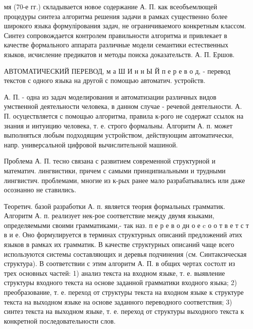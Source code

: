 \documentclass[10pt]{article}
\begin{document}
мя (70-е гг.) складывается новое содержание А. П. как всеобъемлющей процедуры синтеза алгоритма решения задачи в рамках существенно более широкого языка формулірования задач, не ограничиваемого конкретным классом. Синтез сопровождается контролем правильности алгоритма и привлекает в качестве формального аппарата различные модели семантики естественных языков, исчисление предикатов и методы поиска доказательств. А. П. Ершов.



АВТОМАТИЧЕСКИЙ ПЕРЕВОД, м а Ш И н н Ы Й п е р е в о д, - перевод текстов с одного языка на другой с помощью автоматич. устройств.



А. П. - одна из задач моделирования и автоматизации различных видов умственной деятельности человека, в данном случае - речевой деятельности. А. П. осуцествляется с помощью алгоритма, правила к-рого не содержат ссылок на знания и интуицию человека, т. е. строго формальны. Алгоритм А. п. может выполняться любым подходящим устройством, действующим автоматически, напр. универсальной цифровой вычислительной машиной.



Проблема А. П. тесно связана с развитием современной структурной и математич. лингвистики, причем с самыми принципиальными и трудными лингвистич. проблемами, многие из к-рых ранее мало разрабатывались или даже осознанно не ставились.



Теоретич. базой разработки А. п. является теория формальных грамматик. Алгоритм А. п. реализует нек-рое соответствие между двумя языками, определяемыми своими грамматиками,- так наз. п е р е в о дн о е c о о т в е т с т в и е. Оно формулируется в терминах структурных описаний предложений әтих языков в рамках их грамматик. В качестве структурных описаний чаще всего используются системы составляющих и деревья подчинения (см. Синтаксическая структура). В соответствии с этим алгоритм А. П. в общих чертах состолт из трех основных частей: 1) анализ текста на входном языке, т. е. выявление структуры входного текста на основе заданной грамматики входного языка; 2) преобразование, т. е. переход от структуры текста на входном языке к структуре текста на выходном языке на основе заданного переводного соответствия; 3) синтез текста на выходном языке, т. е. переход от структуры выходного текста к конкретной последовательности слов.
\end{document}
